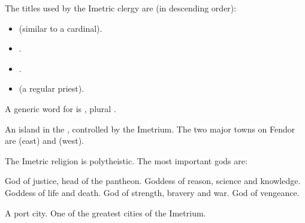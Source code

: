 \begin{gloss}
\begin{subgloss}
  \begin{comment}
  \subparagraph{Clerical ranks}
  \end{comment}
  The titles used by the Imetric clergy are (in descending order): 
  
  \begin{itemize}
    \item \Laccorin{} (similar to a cardinal).
    \item \Ispan.
    \item \Telphan. 
    \item \Amra{} (a regular priest).
  \end{itemize}
  
  A generic word for  is \Stracos, plural \Stracoi. 



  \begin{comment}
  \subparagraph{Fendor}
  \end{comment}
  An island in the \Risvaelsea, controlled by the Imetrium. 
  The two major towns on Fendor are \Fendacor{} (east) and \Cicora{} (west). 



  \begin{comment}
  \subparagraph{Imetric gods}
  \end{comment}
  The Imetric religion is polytheistic. 
  The most important gods are: 
  
  \begin{subgloss}
      God of justice, head of the pantheon.
      Goddess of reason, science and knowledge. 
    \gitem{\NishiS}
    \index{\NishiS}
      Goddess of life and death. 
      God of strength, bravery and war. 
    \gitem{\Hiothrex}
    \index{\Hiothrex}
      God of vengeance. 
  \end{subgloss}



  \begin{comment}
  \subparagraph{Martinum}
  \end{comment}
  A port city. 
  One of the greatest cities of the Imetrium. 
  

\end{subgloss}
\end{gloss}

